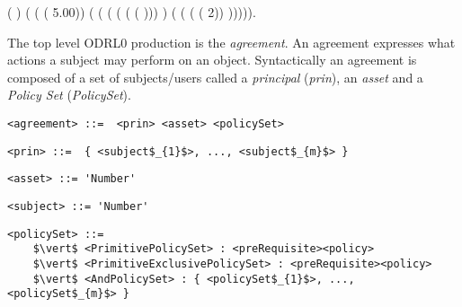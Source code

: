 \coqdoceol
{} ( )  ( ( ( 5.00))\coqdoceol
\coqdocindent{0.50em}
( ( ( ( ( ( )))  )\coqdoceol
\coqdocindent{6.00em}
( ( ( ( 2))  ))))).\coqdoceol
\coqdocemptyline
\coqdocemptyline

The top level ODRL0 production is the \emph{agreement}. An agreement expresses what actions a subject may perform on an object. Syntactically an agreement is composed of a set of subjects/users called a \emph{principal} (\emph{prin}), an \emph{asset} and a \emph{Policy Set} (\emph{PolicySet}).

\lstset{language=AST}
\begin{lstlisting}[caption={agreement},label={lst:agreement}]
<agreement> ::=  <prin> <asset> <policySet> 
\end{lstlisting}



\lstset{mathescape, language=AST}  
\begin{lstlisting}[caption={prin},label={lst:prin}]
<prin> ::=  { <subject$_{1}$>, ..., <subject$_{m}$> }
\end{lstlisting}



\lstset{mathescape, language=AST}  
\begin{lstlisting}[caption={asset},label={lst:asset}]
<asset> ::= 'Number'
\end{lstlisting}


\lstset{mathescape, language=AST}  
\begin{lstlisting}[caption={subject},label={lst:subject}]
<subject> ::= 'Number'
\end{lstlisting}




\lstset{mathescape, language=AST}  
\begin{lstlisting}[caption={policySet},label={lst:policySet}]
<policySet> ::=  
	$\vert$ <PrimitivePolicySet> : <preRequisite><policy> 
	$\vert$ <PrimitiveExclusivePolicySet> : <preRequisite><policy>	 
	$\vert$ <AndPolicySet> : { <policySet$_{1}$>, ..., <policySet$_{m}$> }	
\end{lstlisting}


